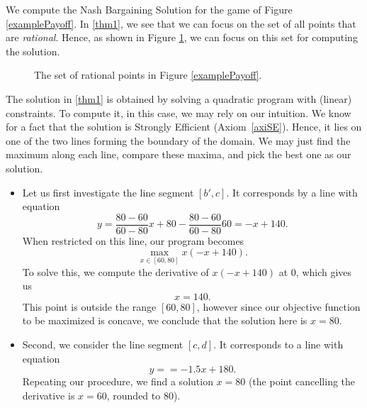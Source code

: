 \begin{example}
We compute the Nash Bargaining Solution for the game of Figure \ref{examplePayoff}.
In \eqref{thm1}, we see that we can focus on the set of all points that are \emph{rational}. Hence, as shown in Figure \ref{example2Payoff}, we can focus on this set for computing the solution.

\begin{figure}[!ht]
\centering
{}
\caption{The set of rational points in Figure \ref{examplePayoff}.}
\label{example2Payoff}
\end{figure}

The solution in \eqref{thm1} is obtained by solving a quadratic program with (linear) constraints.
To compute it,  in this case, we may rely on our intuition.
We know for a fact that the solution is Strongly Efficient (Axiom~\ref{axiSE}). Hence, it lies on one of the two lines forming the boundary of the domain.
We may just find the maximum along each line, compare these maxima, and pick the best one as our solution.

\begin{itemize}
\item Let us first investigate the line segment $[b',c]$. It corresponds by a line with equation
$$ y = \frac{80 - 60}{60 - 80} x + 80 - \frac{80 - 60}{60 - 80} 60 = - x + 140. $$
When restricted on this line, our program becomes
$$ \max_{x \in [60,80]} x (- x + 140). $$
To solve this, we compute the derivative of $x (- x + 140)$ at $0$, which gives us
$$  x = 140. $$
This point is outside the range $[60,80]$, however since our objective function to be maximized is concave, we conclude that the solution here is $x = 80$.
\item Second, we consider the line segment $[c,d]$. It corresponds to a line with equation
$$ y =  = -1.5 x + 180. $$
Repeating our procedure, we find a solution $x = 80$ (the point cancelling the derivative is $x = 60$, rounded to 80).


\end{itemize}
\end{example}
